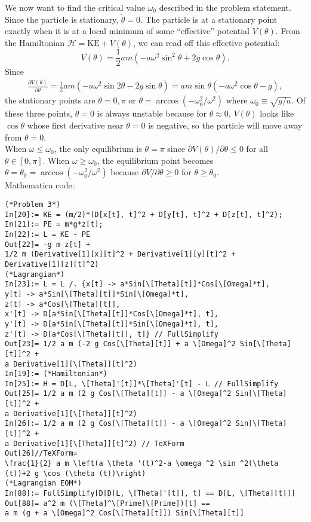\documentclass{article}
\theoremstyle{definition}
\newcommand{\p}{\partial}
\newcommand{\ham}{\mathcal{H}}
\newcommand{\f}[2]{\frac{#1}{#2}}
\newcommand{\lp}{\left(}
\newcommand{\rp}{\right)}
\begin{document}
We now want to find the critical value $\omega_0$ described in the problem statement. Since the particle is stationary, $\dot{\theta} = 0$. The particle is at a stationary point exactly when it is at a local minimum of some ``effective'' potential $V(\theta)$. From the Hamiltonian $\ham = \text{KE} + V(\theta)$, we can read off this effective potential:
\begin{equation*}
V(\theta) = \f{1}{2}am\lp -a\omega^2\sin^2\theta + 2g\cos\theta \rp.
\end{equation*}
Since
\begin{align*}
\f{\p V(\theta)}{\p \theta} = \f{1}{2}am\lp -a\omega^2\sin 2\theta -2g\sin\theta \rp = am\sin\theta \lp -a\omega^2\cos\theta - g  \rp,
\end{align*}
the stationary points are $\theta = 0, \pi$ or $\theta = \arccos(-\omega_0^2/\omega^2)$ where $\boxed{\omega_0 \equiv \sqrt{g/a}}$. Of these three points, $\theta=0$ is always unstable because for $\theta\approx 0$, $V(\theta)$ looks like $\cos\theta$ whose first derivative near $\theta=0$ is negative, so the particle will move away from $\theta=0$. \\

When $\omega \leq \omega_0$, the only equilibrium is $\theta=\pi$ since $\p V(\theta)/\p \theta \leq 0$ for all $\theta \in[0,\pi]$. When $\omega \geq \omega_0 $, the equilibrium point becomes $\theta = \theta_0 = \arccos(-\omega_0^2/\omega^2)$ because $\p V/\p \theta \geq 0$ for $\theta \geq \theta_0$.\\


Mathematica code:
\begin{lstlisting}
(*Problem 3*)
In[20]:= KE = (m/2)*(D[x[t], t]^2 + D[y[t], t]^2 + D[z[t], t]^2);
In[21]:= PE = m*g*z[t];
In[22]:= L = KE - PE
Out[22]= -g m z[t] + 
1/2 m (Derivative[1][x][t]^2 + Derivative[1][y][t]^2 + 
Derivative[1][z][t]^2)
(*Lagrangian*)
In[23]:= L = L /. {x[t] -> a*Sin[\[Theta][t]]*Cos[\[Omega]*t], 
y[t] -> a*Sin[\[Theta][t]]*Sin[\[Omega]*t], 
z[t] -> a*Cos[\[Theta][t]],
x'[t] -> D[a*Sin[\[Theta][t]]*Cos[\[Omega]*t], t], 
y'[t] -> D[a*Sin[\[Theta][t]]*Sin[\[Omega]*t], t], 
z'[t] -> D[a*Cos[\[Theta][t]], t]} // FullSimplify
Out[23]= 1/2 a m (-2 g Cos[\[Theta][t]] + a \[Omega]^2 Sin[\[Theta][t]]^2 + 
a Derivative[1][\[Theta]][t]^2)
In[19]:= (*Hamiltonian*)
In[25]:= H = D[L, \[Theta]'[t]]*\[Theta]'[t] - L // FullSimplify
Out[25]= 1/2 a m (2 g Cos[\[Theta][t]] - a \[Omega]^2 Sin[\[Theta][t]]^2 + 
a Derivative[1][\[Theta]][t]^2)
In[26]:= 1/2 a m (2 g Cos[\[Theta][t]] - a \[Omega]^2 Sin[\[Theta][t]]^2 + 
a Derivative[1][\[Theta]][t]^2) // TeXForm
Out[26]//TeXForm=
\frac{1}{2} a m \left(a \theta '(t)^2-a \omega ^2 \sin ^2(\theta
(t))+2 g \cos (\theta (t))\right)
(*Lagrangian EOM*)
In[88]:= FullSimplify[D[D[L, \[Theta]'[t]], t] == D[L, \[Theta][t]]]
Out[88]= a^2 m (\[Theta]^\[Prime]\[Prime])[t] == 
a m (g + a \[Omega]^2 Cos[\[Theta][t]]) Sin[\[Theta][t]]
\end{lstlisting}
\end{document}
